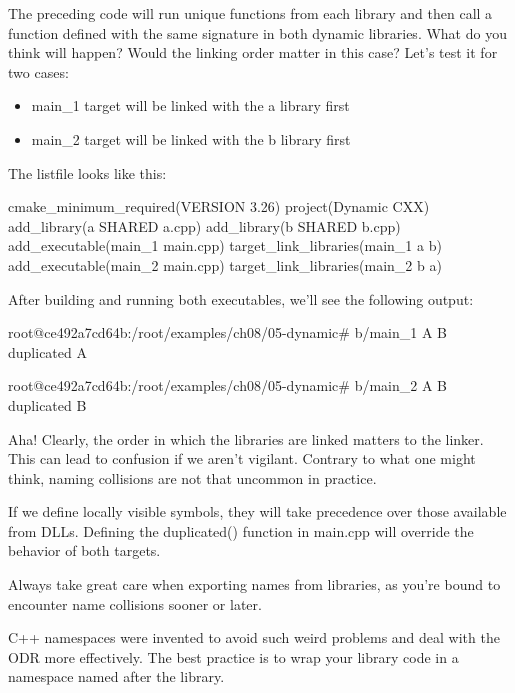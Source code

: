 The preceding code will run unique functions from each library and then call a function defined with the same signature in both dynamic libraries. What do you think will happen? Would the linking order matter in this case? Let’s test it for two cases:

\begin{itemize}
\item
main\_1 target will be linked with the a library first

\item
main\_2 target will be linked with the b library first
\end{itemize}

The listfile looks like this:


\begin{cmake}
cmake_minimum_required(VERSION 3.26)
project(Dynamic CXX)
add_library(a SHARED a.cpp)
add_library(b SHARED b.cpp)
add_executable(main_1 main.cpp)
target_link_libraries(main_1 a b)
add_executable(main_2 main.cpp)
target_link_libraries(main_2 b a)
\end{cmake}

After building and running both executables, we’ll see the following output:

\begin{shell}
root@ce492a7cd64b:/root/examples/ch08/05-dynamic# b/main_1
A
B
duplicated A

root@ce492a7cd64b:/root/examples/ch08/05-dynamic# b/main_2
A
B
duplicated B
\end{shell}

Aha! Clearly, the order in which the libraries are linked matters to the linker. This can lead to confusion if we aren’t vigilant. Contrary to what one might think, naming collisions are not that uncommon in practice.

If we define locally visible symbols, they will take precedence over those available from DLLs. Defining the duplicated() function in main.cpp will override the behavior of both targets.

Always take great care when exporting names from libraries, as you’re bound to encounter name collisions sooner or later.


C++ namespaces were invented to avoid such weird problems and deal with the ODR more effectively. The best practice is to wrap your library code in a namespace named after the library.

